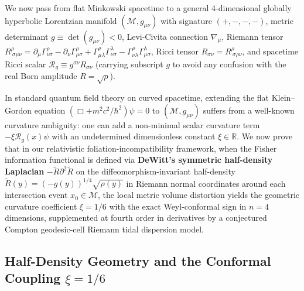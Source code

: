\documentclass[11pt, a4paper]{article}
\theoremstyle{definition}
\begin{document}
We now pass from flat Minkowski spacetime to a general 4-dimensional globally hyperbolic Lorentzian manifold $(\mathcal{M}, g_{\mu\nu})$ with signature $(+,-,-,-)$, metric determinant $g \equiv \det(g_{\mu\nu}) < 0$, Levi-Civita connection $\nabla_\mu$, Riemann tensor $R^\rho_{\ \sigma\mu\nu} = \partial_\mu \Gamma^\rho_{\nu\sigma} - \partial_\nu \Gamma^\rho_{\mu\sigma} + \Gamma^\rho_{\mu\lambda}\Gamma^\lambda_{\nu\sigma} - \Gamma^\rho_{\nu\lambda}\Gamma^\lambda_{\mu\sigma}$, Ricci tensor $R_{\sigma\nu} = R^\rho_{\ \sigma\rho\nu}$, and spacetime Ricci scalar $\mathcal{R}_g \equiv g^{\sigma\nu}R_{\sigma\nu}$ (carrying subscript $g$ to avoid any confusion with the real Born amplitude $R = \sqrt{\rho}$).

In standard quantum field theory on curved spacetime, extending the flat Klein--Gordon equation $(\Box + m^2c^2/\hbar^2)\psi = 0$ to $(\mathcal{M}, g_{\mu\nu})$ suffers from a well-known curvature ambiguity: one can add a non-minimal scalar curvature term $-\xi \mathcal{R}_g(x)\psi$ with an undetermined dimensionless constant $\xi \in \mathbb{R}$. We now prove that in our relativistic foliation-incompatibility framework, when the Fisher information functional is defined via \textbf{DeWitt's symmetric half-density Laplacian} $-\tilde{R}\partial^2\tilde{R}$ \cite{DeWitt1957} on the diffeomorphism-invariant half-density $\tilde{R}(y) = (-g(y))^{1/4}\sqrt{\rho(y)}$ in Riemann normal coordinates around each intersection event $x_0 \in \mathcal{M}$, the local metric volume distortion yields the geometric curvature coefficient $\xi = 1/6$ with the exact Weyl-conformal sign in $n = 4$ dimensions, supplemented at fourth order in derivatives by a conjectured Compton geodesic-cell Riemann tidal dispersion model.

\subsection{Half-Density Geometry and the Conformal Coupling \texorpdfstring{$\xi = 1/6$}{xi = 1/6}}
\end{document}

